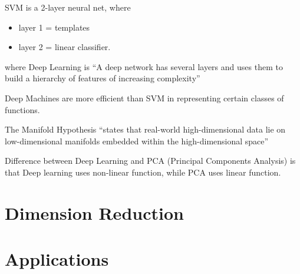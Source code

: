 \documentclass[
]{book}
\providecommand{\tightlist}{%
  \setlength{\itemsep}{0pt}\setlength{\parskip}{0pt}}
\begin{document}
SVM is a 2-layer neural net, where

\begin{itemize}
\tightlist
\item
  layer 1 = templates
\item
  layer 2 = linear classifier.
\end{itemize}

where Deep Learning is ``A deep network has several layers and uses them to build a hierarchy of features of increasing complexity''

Deep Machines are more efficient than SVM in representing certain classes of functions.

The Manifold Hypothesis ``states that real-world high-dimensional data lie on low-dimensional manifolds embedded within the high-dimensional space''

Difference between Deep Learning and PCA (Principal Components Analysis) is that Deep learning uses non-linear function, while PCA uses linear function.

\hypertarget{dimension-reduction-1}{%
\chapter{Dimension Reduction}\label{dimension-reduction-1}}

\hypertarget{applications}{%
\chapter{Applications}\label{applications}}
\end{document}
